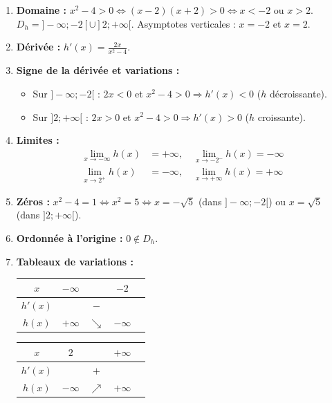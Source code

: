 \documentclass[11pt]{article}
\begin{document}
\begin{corrige}[Exercice n°3 : $h(x) = ln(x^2-4)$]
\begin{enumerate}
    \item \textbf{Domaine :} $x^2-4 > 0 \iff (x-2)(x+2) > 0 \iff x < -2$ ou $x > 2$.
    $D_h = ]-\infty; -2[ \cup ]2; +\infty[$. Asymptotes verticales : $x=-2$ et $x=2$.
    \item \textbf{Dérivée :} $h'(x) = \frac{2x}{x^2-4}$.
    \item \textbf{Signe de la dérivée et variations :}
    \begin{itemize}
        \item Sur $]-\infty; -2[$ : $2x < 0$ et $x^2-4 > 0 \Rightarrow h'(x) < 0$ ($h$ décroissante).
        \item Sur $]2; +\infty[$ : $2x > 0$ et $x^2-4 > 0 \Rightarrow h'(x) > 0$ ($h$ croissante).
    \end{itemize}
    \item \textbf{Limites :}
    \begin{align*}
        \lim_{x\to -\infty} h(x) &= +\infty, \quad \lim_{x\to -2^-} h(x) = -\infty \\
        \lim_{x\to 2^+} h(x) &= -\infty, \quad \lim_{x\to +\infty} h(x) = +\infty
    \end{align*}
    \item \textbf{Zéros :} $x^2-4 = 1 \iff x^2 = 5 \iff x = -\sqrt{5}$ (dans $]-\infty;-2[$) ou $x = \sqrt{5}$ (dans $]2;+\infty[$).
    \item \textbf{Ordonnée à l'origine :} $0 \notin D_h$.
    \item \textbf{Tableaux de variations :}
    \begin{center}
    \begin{tabular}{|c|cccc|}\hline
    $x$ & $-\infty$ & & $-2$ & \\ \hline
    $h'(x)$ & & $-$ & & \\ \hline
    $h(x)$ & $+\infty$ & $\searrow$ & $-\infty$ & \\ \hline
    \end{tabular}
    \qquad
    \begin{tabular}{|c|cccc|}\hline
    $x$ & $2$ & & $+\infty$ & \\ \hline
    $h'(x)$ & & $+$ & & \\ \hline
    $h(x)$ & $-\infty$ & $\nearrow$ & $+\infty$ & \\ \hline
    \end{tabular}
    \end{center}
\end{enumerate}
\end{corrige}
\end{document}
